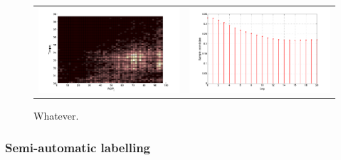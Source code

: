 \begin{figure}
\begin{center}
\begin{tabular}{c@{}c}
\includegraphics[scale=0.2]{./figures/VT_TRQ_ROP_density} &

\includegraphics[scale=0.2]{./figures/VT_crossCorrTRQvsROP}  \\

\end{tabular}
\caption{\label{Figure:VTTorqueRateOfPenetration}  Whatever.}
\end{center}
\end{figure}






\subsubsection{Semi-automatic labelling}\label{SubSection:SemiAutomaticLabelling}

